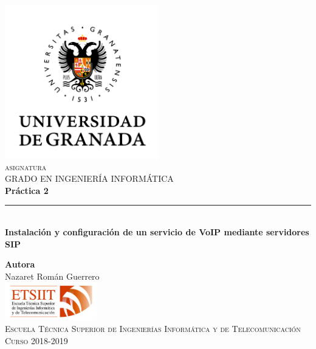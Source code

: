 \documentclass[11pt,a4paper]{article}
\begin{document}
\begin{titlepage}

\begin{minipage}{\textwidth}

\centering
\includegraphics[width=0.5\textwidth]{img/logo.png}\\

\textsc{\Large asignatura\\[0.2cm]}
\textsc{GRADO EN INGENIERÍA INFORMÁTICA}\\[1cm]

{\Huge\bfseries Práctica 2\\}
\noindent\rule[-1ex]{\textwidth}{3pt}\\[3.5ex]
{\large\bfseries Instalación y configuración de un servicio de VoIP mediante servidores SIP}
\end{minipage}

\vspace{1.5cm}
\begin{minipage}{\textwidth}
\centering

\textbf{Autora}\\ {Nazaret Román Guerrero}\\[2.5ex]
\includegraphics[width=0.3\textwidth]{img/etsiit.jpeg}\\[0.1cm]
\vspace{1cm}
\textsc{Escuela Técnica Superior de Ingenierías Informática y de Telecomunicación}\\
\vspace{1cm}
\textsc{Curso 2018-2019}
\end{minipage}
\end{titlepage}

\tableofcontents
\thispagestyle{empty}
\end{document}

